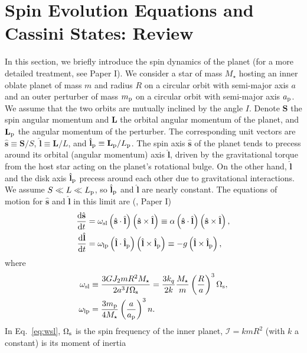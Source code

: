 \documentclass[
        fleqn,
        usenatbib,
    ]{mnras}
\newcommand*{\rd}[2]{\frac{\mathrm{d}#1}{\mathrm{d}#2}}
\newcommand*{\p}[1]{\left(#1\right)}
\newcommand*{\bm}[1]{\mathbf{#1}}
\newcommand*{\uv}[1]{\hat{\boldsymbol{\mathbf{#1}}}}
\begin{document}
\section{Spin Evolution Equations and Cassini States: Review}\label{s:theory}

In this section, we briefly introduce the spin dynamics of the planet (for a
more detailed treatment, see Paper I). We consider a star of mass $M_\star$
hosting an inner oblate planet of mass $m$ and radius $R$ on a circular orbit
with semi-major axis $a$ and an outer perturber of mass $m_{\rm p}$ on a
circular orbit with semi-major axis $a_{\rm p}$. We assume that the two orbits
are mutually inclined by the angle $I$. Denote $\bm{S}$ the spin angular
momentum and $\bm{L}$ the orbital angular momentum of the planet, and
$\bm{L}_{\rm p}$ the angular momentum of the perturber. The corresponding unit
vectors are $\uv{s} \equiv \bm{S} / S$, $\uv{l} \equiv \bm{L} / L$, and
$\uv{l}_{\rm p} \equiv \bm{L}_{\rm p} / L_{\rm p}$. The spin axis $\uv{s}$ of
the planet tends to precess around its orbital (angular momentum) axis $\uv{l}$,
driven by the gravitational torque from the host star acting on the planet's
rotational bulge. On the other hand, $\uv{l}$ and the disk axis $\uv{l}_{\rm p}$
precess around each other due to gravitational interactions. We assume $S \ll L
\ll L_{\rm p}$, so $\uv{l}_{\rm p}$ and $\uv{l}$ are nearly constant. The
equations of motion for $\uv{s}$ and $\uv{l}$ in this limit are
(\citealp{anderson2018teeter}, Paper I)
\begin{align}
    \rd{\uv{s}}{t}
        &= \omega_{\rm sl}\p{\uv{s} \cdot \uv{l}}\p{\uv{s} \times \uv{l}}
        \equiv \alpha\p{\uv{s} \cdot \uv{l}}\p{\uv{s} \times
        \uv{l}},\label{eq:dsdt1}\\
    \rd{\uv{l}}{t} &= \omega_{\rm lp}\p{\uv{l} \cdot \uv{l}_{\rm p}}\p{\uv{l}
        \times \uv{l}_{\rm p}} \equiv -g\p{\uv{l} \times \uv{l}_{\rm p}},
        \label{eq:dldt1}
\end{align}
where
\begin{align}
    \omega_{\rm sl} &\equiv \frac{3GJ_2 mR^2 M_\star}{2a^3 I\Omega_{\rm s}}
        = \frac{3k_q}{2k}\frac{M_\star}{m}\p{\frac{R}{a}}^3 \Omega_{\rm s},
            \label{eq:wsl}\\
    \omega_{\rm lp} &= \frac{3m_{\rm p}}{4M_\star}\p{\frac{a}{a_{\rm p}}}^3
        n.\label{eq:wlp}
\end{align}
In Eq.~\eqref{eq:wsl}, $\Omega_{\rm s}$ is the spin frequency of the inner
planet, $\mathcal{I} = k mR^2$ (with $k$ a constant) is its moment of inertia
\end{document}
